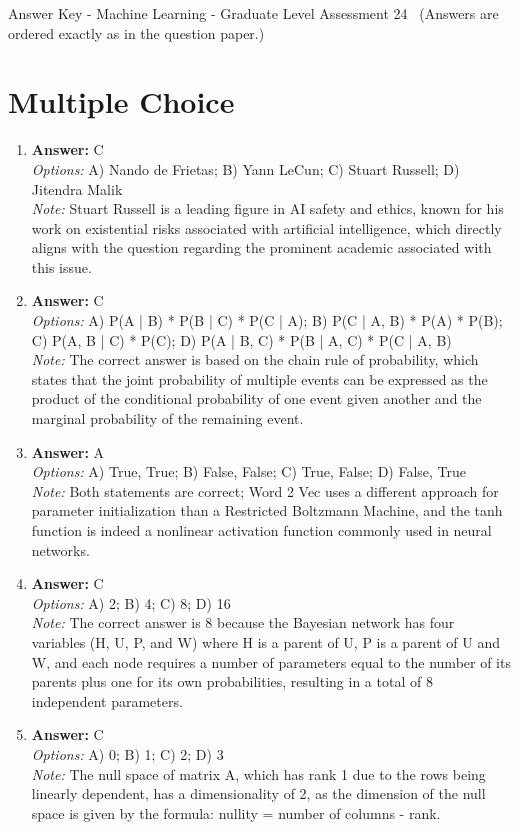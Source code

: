 \documentclass[12pt]{article}
\begin{document}
\begin{center}
Answer Key - Machine Learning - Graduate Level Assessment 24 \
\small (Answers are ordered exactly as in the question paper.)
\end{center}

\section*{Multiple Choice}
\begin{enumerate}[label=\arabic*.]
\item \textbf{Answer:} C
\\ \textit{Options:} A) Nando de Frietas; B) Yann LeCun; C) Stuart Russell; D) Jitendra Malik
\\ \textit{Note:} Stuart Russell is a leading figure in AI safety and ethics, known for his work on existential risks associated with artificial intelligence, which directly aligns with the question regarding the prominent academic associated with this issue.
\item \textbf{Answer:} C
\\ \textit{Options:} A) P(A | B) * P(B | C) * P(C | A); B) P(C | A, B) * P(A) * P(B); C) P(A, B | C) * P(C); D) P(A | B, C) * P(B | A, C) * P(C | A, B)
\\ \textit{Note:} The correct answer is based on the chain rule of probability, which states that the joint probability of multiple events can be expressed as the product of the conditional probability of one event given another and the marginal probability of the remaining event.
\item \textbf{Answer:} A
\\ \textit{Options:} A) True, True; B) False, False; C) True, False; D) False, True
\\ \textit{Note:} Both statements are correct; Word 2 Vec uses a different approach for parameter initialization than a Restricted Boltzmann Machine, and the tanh function is indeed a nonlinear activation function commonly used in neural networks.
\item \textbf{Answer:} C
\\ \textit{Options:} A) 2; B) 4; C) 8; D) 16
\\ \textit{Note:} The correct answer is 8 because the Bayesian network has four variables (H, U, P, and W) where H is a parent of U, P is a parent of U and W, and each node requires a number of parameters equal to the number of its parents plus one for its own probabilities, resulting in a total of 8 independent parameters.
\item \textbf{Answer:} C
\\ \textit{Options:} A) 0; B) 1; C) 2; D) 3
\\ \textit{Note:} The null space of matrix A, which has rank 1 due to the rows being linearly dependent, has a dimensionality of 2, as the dimension of the null space is given by the formula: nullity = number of columns - rank.
\end{enumerate}
\end{document}
